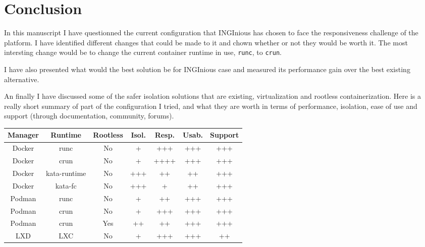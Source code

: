 \chapter{Conclusion}

In this manuscript I have questionned the current configuration that INGInious has chosen to face the responsiveness challenge of the platform.  I have identified different changes that could be made to it and chown whether or not they would be worth it.  The most intersting change would be to change the current container runtime in use, \texttt{runc}, to \texttt{crun}.

I have also presented what would the best solution be for INGInious case and measured its performance gain over the best existing alternative.

An finally I have discussed some of the safer isolation solutions that are existing, virtualization and rootless containerization.  Here is a really short summary of part of the configuration I tried, and what they are worth in terms of performance, isolation, ease of use and support (through documentation, community, forums).

\begin{center}
  \begin{tabular}{|ccc|c|c|c|c|}
    \hline
    \textbf{Manager} & \textbf{Runtime} & \textbf{Rootless} & \textbf{Isol.}\footnotemark & \textbf{Resp.}\footnotemark & \textbf{Usab.}\footnotemark & \textbf{Support} \\
    \hline
    \hline
    Docker & runc & No & + & +++ & +++ & +++ \\
    Docker & crun & No & + & ++++ & +++ & +++\\
    Docker & kata-runtime\footnotemark & No & +++ & ++ & ++ & +++\\
    Docker & kata-fc\footnotemark & No & +++ & + & ++ & +++\\
    Podman & runc & No & + & ++ & +++ & +++\\
    Podman & crun & No & + & +++ & +++ & +++\\
    Podman & crun & Yes & ++ & ++ & +++ & +++\\
    LXD & LXC & No & + & +++ & +++ & ++\\
    \hline
  \end{tabular}
\end{center}

